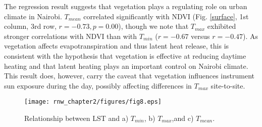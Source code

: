  The regression result suggests that vegetation plays a regulating role on urban climate in Nairobi. $T_{mean}$ correlated significantly with NDVI (Fig. \ref{surface}, 1st column, 3rd row, $r =-0 .73, p = 0.00$), though we note that $T_{max}$ exhibited stronger correlations with NDVI than with $T_{min}$ ($r = -0.67$ versus $r = -0.47$). As vegetation affects evapotranspiration and thus latent heat release, this is consistent with the hypothesis that vegetation is effective at reducing daytime heating and that latent heating plays an important control on Nairobi climate. This result does, however, carry the caveat that vegetation influences instrument sun exposure during the day, possibly affecting differences in $ T_{max}$ site-to-site.
 

\begin{figure}
\texttt{[image: rnw\_chapter2/figures/fig8.eps]}
\caption{%
Relationship between LST and a) $T_{min}$, b) $T_{max}$,and c) $T_{mean}$.}
\label{lst}
\end{figure}

